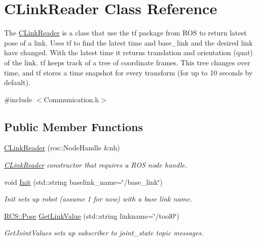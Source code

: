 \hypertarget{classCLinkReader}{\section{C\-Link\-Reader Class Reference}
\label{classCLinkReader}
}


The \hyperlink{classCLinkReader}{C\-Link\-Reader} is a class that use the tf package from R\-O\-S to return latest pose of a link. Uses tf to find the latest time and base\-\_\-link and the desired link have changed. With the latest time it returns translation and orientation (quat) of the link. tf keeps track of a tree of coordinate frames. This tree changes over time, and tf stores a time snapshot for every transform (for up to 10 seconds by default).  




{\ttfamily \#include $<$Communication.\-h$>$}

\subsection*{Public Member Functions}
\begin{DoxyCompactItemize}
\item 
\hyperlink{classCLinkReader_a7d71d8a8e0b82427bf1d76025ced4213}{C\-Link\-Reader} (ros\-::\-Node\-Handle \&nh)
\begin{DoxyCompactList}\small\item\em \hyperlink{classCLinkReader}{C\-Link\-Reader} constructor that requires a R\-O\-S node handle. \end{DoxyCompactList}\item 
void \hyperlink{classCLinkReader_ab4adade4dc8af8ec3bb295c1028720af}{Init} (std\-::string baselink\-\_\-name=\char`\"{}/base\-\_\-link\char`\"{})
\begin{DoxyCompactList}\small\item\em Init sets up robot (assume 1 for now) with a base link name. \end{DoxyCompactList}\item 
\hyperlink{namespaceRCS_aa07e45d8a50e30064283d2b38087f999}{R\-C\-S\-::\-Pose} \hyperlink{classCLinkReader_a2474b4c72d69a7d29cd1f47e1ac2a155}{Get\-Link\-Value} (std\-::string linkname=\char`\"{}/tool0\char`\"{})
\begin{DoxyCompactList}\small\item\em Get\-Joint\-Values sets up subscriber to joint\-\_\-state topic messages. \end{DoxyCompactList}\end{DoxyCompactItemize}
